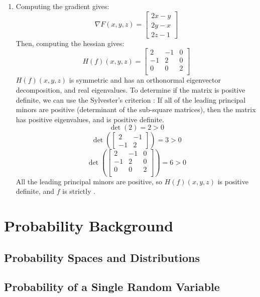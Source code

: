 \begin{enumerate}
    \item Computing the gradient gives:
    $$\nabla F(x,y,z) = 
    \begin{bmatrix}
        2x -y \\
        2y -x \\
        2z -1
    \end{bmatrix}$$
    Then, computing the hessian gives:
    $$H(f)(x,y,z) = 
    \begin{bmatrix}
        2 & -1 & 0 \\
        -1 & 2 & 0 \\
        0 & 0 & 2 \\
    \end{bmatrix}$$
    $H(f)(x,y,z)$ is symmetric and has an orthonormal eigenvector decomposition, and real eigenvalues. To determine if the matrix is positive definite, we can use the Sylvester's criterion : If all of the leading principal minors are positive (determinant of the sub-square matrices), then the matrix has positive eigenvalues, and is positive definite.
    $$\det(2) = 2 > 0$$
    $$\det \left (\begin{bmatrix}
        2 & -1 \\
        -1 & 2
    \end{bmatrix} \right) = 3 > 0$$
    $$\det \left (\begin{bmatrix}
        2 & -1 & 0 \\
        -1 & 2 & 0 \\
        0 & 0 & 2 \\
    \end{bmatrix} \right) = 6 > 0$$
    All the leading principal minors are positive, so $H(f)(x,y,z)$ is positive definite, and $f$ is strictly \cvx.
\end{enumerate}

\chapter{Probability Background} \label{prob-theory}

\section{Probability Spaces and Distributions}

\section{Probability of a Single Random Variable}


